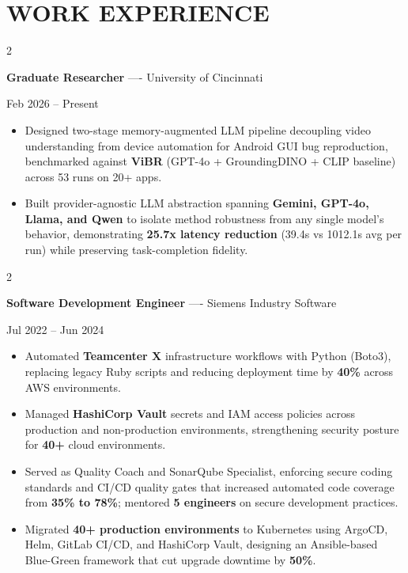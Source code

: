 \documentclass[10pt, letterpaper]{article}
\newenvironment{highlights}{
    \begin{itemize}[
        topsep=0.10 cm,
        parsep=0.06 cm,
        partopsep=0pt,
        itemsep=0.06 cm,
        leftmargin=12pt
    ]
}{
    \end{itemize}
}
\newenvironment{twocolentry}[2][]{
    \onecolentry
    \def\secondColumn{#2}
    \setcolumnwidth{\fill, 4.5 cm}
    \begin{paracol}{2}
}{
    \switchcolumn \raggedleft \secondColumn
    \end{paracol}
    \endonecolentry
}
\begin{document}
\section{WORK EXPERIENCE}
\begin{twocolentry}{Feb 2026 -- Present}
\textbf{Graduate Researcher} ---- University of Cincinnati
\end{twocolentry}
\begin{highlights}
  \item Designed two-stage memory-augmented LLM pipeline decoupling video understanding from device automation for Android GUI bug reproduction, benchmarked against \textbf{ViBR} (GPT-4o + GroundingDINO + CLIP baseline) across 53 runs on 20+ apps.
  \item Built provider-agnostic LLM abstraction spanning \textbf{Gemini, GPT-4o, Llama, and Qwen} to isolate method robustness from any single model's behavior, demonstrating \textbf{25.7x latency reduction} (39.4s vs 1012.1s avg per run) while preserving task-completion fidelity.
\end{highlights}

\vspace{0.15 cm}

\begin{twocolentry}{Jul 2022 -- Jun 2024}
\textbf{Software Development Engineer} ---- Siemens Industry Software
\end{twocolentry}
\begin{highlights}
  \item Automated \textbf{Teamcenter X} infrastructure workflows with Python (Boto3), replacing legacy Ruby scripts and reducing deployment time by \textbf{40\%} across AWS environments.
  \item Managed \textbf{HashiCorp Vault} secrets and IAM access policies across production and non-production environments, strengthening security posture for \textbf{40+} cloud environments.
  \item Served as Quality Coach and SonarQube Specialist, enforcing secure coding standards and CI/CD quality gates that increased automated code coverage from \textbf{35\% to 78\%}; mentored \textbf{5 engineers} on secure development practices.
  \item Migrated \textbf{40+ production environments} to Kubernetes using ArgoCD, Helm, GitLab CI/CD, and HashiCorp Vault, designing an Ansible-based Blue-Green framework that cut upgrade downtime by \textbf{50\%}.
\end{highlights}
\end{document}
